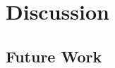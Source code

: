 \documentclass[thesis.tex]{subfile}
\begin{document}
\chapter{Discussion} \label{Discussion}
\section{Future Work}
\end{document}
